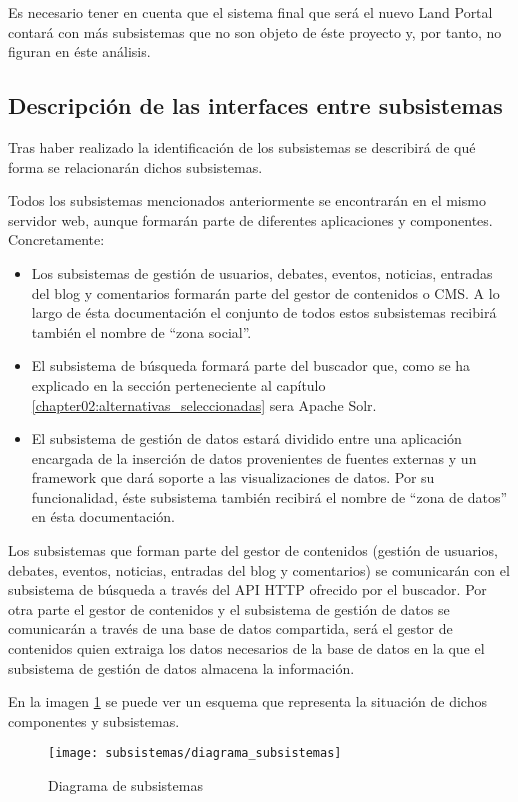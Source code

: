 Es necesario tener en cuenta que el sistema final que será el nuevo Land Portal contará con más subsistemas que no son objeto de éste proyecto y, por tanto, no figuran en éste análisis.


\subsection{Descripción de las interfaces entre subsistemas}
Tras haber realizado la identificación de los subsistemas  se describirá de qué forma se relacionarán dichos subsistemas.

Todos los subsistemas mencionados anteriormente se encontrarán en el mismo servidor web, aunque formarán parte de diferentes aplicaciones y componentes.  Concretamente:
\begin{itemize}
\item Los subsistemas de gestión de usuarios, debates, eventos, noticias, entradas del blog y comentarios formarán parte del gestor de contenidos o CMS.  A lo largo de ésta documentación el conjunto de todos estos subsistemas recibirá también el nombre de ``zona social''.
\item El subsistema de búsqueda formará parte del buscador que, como se ha explicado en la sección  perteneciente al capítulo \ref{chapter02:alternativas_seleccionadas} sera Apache Solr.
\item El subsistema de gestión de datos estará dividido entre una aplicación encargada de la inserción de datos provenientes de fuentes externas y un framework que dará soporte a las visualizaciones de datos.  Por su funcionalidad, éste subsistema también recibirá el nombre de ``zona de datos'' en ésta documentación.
\end{itemize}

Los subsistemas que forman parte del gestor de contenidos (gestión de usuarios, debates, eventos, noticias, entradas del blog y comentarios) se comunicarán con el subsistema de búsqueda a través del API HTTP ofrecido por el buscador. \newline
Por otra parte el gestor de contenidos y el subsistema de gestión de datos se comunicarán a través de una base de datos compartida, será el gestor de contenidos quien extraiga los datos necesarios de la base de datos en la que el subsistema de gestión de datos almacena la información.

En la imagen \ref{fig:diagrama_subsistemas} se puede ver un esquema que representa la situación de dichos componentes y subsistemas.

\begin{figure}[h]
\centering
\texttt{[image: subsistemas/diagrama\_subsistemas]}
\caption{Diagrama de subsistemas}
\label{fig:diagrama_subsistemas}
\end{figure}